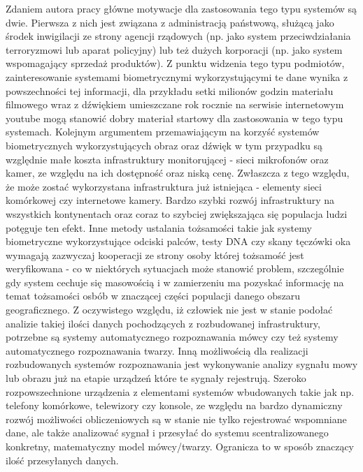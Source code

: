 Zdaniem autora pracy główne motywacje dla zastosowania tego typu systemów są dwie. Pierwsza z nich jest związana z administracją państwową, służącą jako środek inwigilacji ze strony agencji rządowych (np. jako system przeciwdziałania terroryzmowi lub aparat policyjny) lub też dużych korporacji (np. jako system wspomagający sprzedaż produktów). Z punktu widzenia tego typu podmiotów, zainteresowanie systemami biometrycznymi wykorzystującymi te dane wynika z powszechności tej
informacji, dla przykładu setki milionów godzin materiału filmowego wraz z dźwiękiem umieszczane rok rocznie na serwisie internetowym youtube \cite{ystats} mogą stanowić dobry materiał startowy dla zastosowania w tego typu systemach. Kolejnym argumentem przemawiającym na korzyść systemów biometrycznych wykorzystujących obraz oraz dźwięk w tym przypadku są względnie małe koszta infrastruktury monitorującej - sieci mikrofonów oraz kamer, ze względu na ich dostępność oraz
niską cenę. Zwłaszcza z tego względu, że może zostać wykorzystana infrastruktura już istniejąca - elementy sieci komórkowej czy internetowe kamery. Bardzo szybki rozwój infrastruktury na wszystkich kontynentach oraz coraz to szybciej zwiększająca się populacja ludzi potęguje ten efekt. Inne metody ustalania tożsamości takie jak systemy biometryczne wykorzystujące odciski palców, testy DNA czy skany tęczówki oka wymagają zazwyczaj kooperacji ze strony osoby
której tożsamość jest weryfikowana - co w niektórych sytuacjach może stanowić problem, szczególnie gdy system cechuje się masowością i w zamierzeniu ma pozyskać informację na temat tożsamości osbób w znaczącej części populacji danego obszaru geograficznego. Z oczywistego względu, iż człowiek nie jest w stanie podołać analizie takiej ilości danych pochodzących z rozbudowanej infrastruktury, potrzebne są systemy automatycznego rozpoznawania mówcy czy też systemy automatycznego rozpoznawania twarzy.
Inną możliwością dla realizacji rozbudowanych systemów rozpoznawania jest wykonywanie analizy sygnału mowy lub obrazu już na etapie urządzeń które te sygnały rejestrują. Szeroko rozpowszechnione urządzenia z elementami systemów wbudowanych takie jak np. telefony komórkowe, telewizory czy konsole, ze względu na bardzo dynamiczny rozwój możliwości obliczeniowych są w stanie nie tylko rejestrować wspomniane dane, ale także analizować sygnał i przesyłać do systemu scentralizowanego konkretny, matematyczny model mówcy/twarzy. Ogranicza to w sposób znaczący ilość przesyłanych danych.

